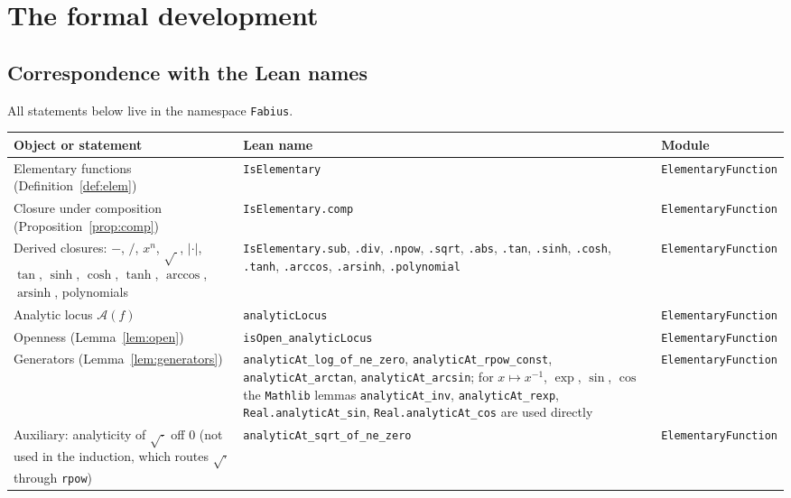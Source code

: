 \documentclass[11pt,oneside]{article}
\theoremstyle{definition}
\theoremstyle{remark}
\newcommand{\An}{\mathcal A}
\begin{document}
\section{The formal development}

\subsection{Correspondence with the Lean names}

All statements below live in the namespace \texttt{Fabius}.

\begin{center}
\small
\begin{tabular}{@{}p{}p{}p{}@{}}
\toprule
\textbf{Object or statement} & \textbf{Lean name} & \textbf{Module} \\
\midrule
Elementary functions (Definition~\ref{def:elem})
  & \texttt{IsElementary}
  & \texttt{ElementaryFunction} \\
Closure under composition (Proposition~\ref{prop:comp})
  & \texttt{IsElementary.comp}
  & \texttt{ElementaryFunction} \\
Derived closures: $-$, $/$, $x^n$, $\sqrt{\ }$, $|\cdot|$, $\tan$, $\sinh$, $\cosh$, $\tanh$, $\arccos$, $\operatorname{arsinh}$, polynomials
  & \texttt{IsElementary.sub}, \texttt{.div}, \texttt{.npow}, \texttt{.sqrt}, \texttt{.abs}, \texttt{.tan}, \texttt{.sinh}, \texttt{.cosh}, \texttt{.tanh}, \texttt{.arccos}, \texttt{.arsinh}, \texttt{.polynomial}
  & \texttt{ElementaryFunction} \\
Analytic locus $\An(f)$
  & \texttt{analyticLocus}
  & \texttt{ElementaryFunction} \\
Openness (Lemma~\ref{lem:open})
  & \texttt{isOpen\_analyticLocus}
  & \texttt{ElementaryFunction} \\
Generators (Lemma~\ref{lem:generators})
  & \texttt{analyticAt\_log\_of\_ne\_zero}, \texttt{analyticAt\_rpow\_const}, \texttt{analyticAt\_arctan}, \texttt{analyticAt\_arcsin}; for $x\mapsto x^{-1}$, $\exp$, $\sin$, $\cos$ the \texttt{Mathlib} lemmas \texttt{analyticAt\_inv}, \texttt{analyticAt\_rexp}, \texttt{Real.analyticAt\_sin}, \texttt{Real.analyticAt\_cos} are used directly
  & \texttt{ElementaryFunction} \\
Auxiliary: analyticity of $\sqrt{\cdot}$ off $0$ (not used in the induction, which routes $\sqrt{\cdot}$ through \texttt{rpow})
  & \texttt{analyticAt\_sqrt\_of\_ne\_zero}
  & \texttt{ElementaryFunction} \\

\end{tabular}
\end{center}
\end{document}
